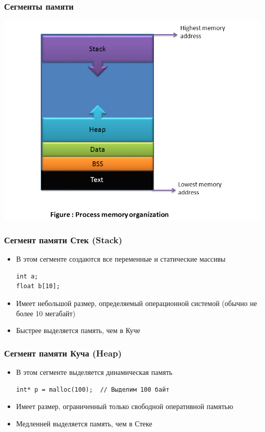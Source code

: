 \documentclass[10pt,pdf,hyperref={unicode}]{beamer}
\begin{document}
\begin{frame}[fragile]
\frametitle{Сегменты памяти}
\begin{center}
\includegraphics[width=0.86\linewidth]{../images/process_memory_organization.png}
\end{center}
\end{frame}


\begin{frame}[fragile]
\frametitle{Сегмент памяти Стек (Stack)}
\begin{itemize}
\item В этом сегменте создаются все переменные и статические массивы
\begin{lstlisting}
int a;
float b[10];
\end{lstlisting}
\item Имеет небольшой размер, определяемый операционной системой (обычно не более 10 мегабайт)
\item Быстрее выделяется память, чем в Куче
\end{itemize}
\end{frame}


\begin{frame}[fragile]
\frametitle{Сегмент памяти Куча (Heap)}
\begin{itemize}
\item В этом сегменте выделяется динамическая память
\begin{lstlisting}
int* p = malloc(100);  // Выделим 100 байт
\end{lstlisting}
\item Имеет размер, ограниченный только свободной оперативной памятью
\item Медленней выделяется память, чем в Стеке
\end{itemize}
\end{frame}
\end{document}
